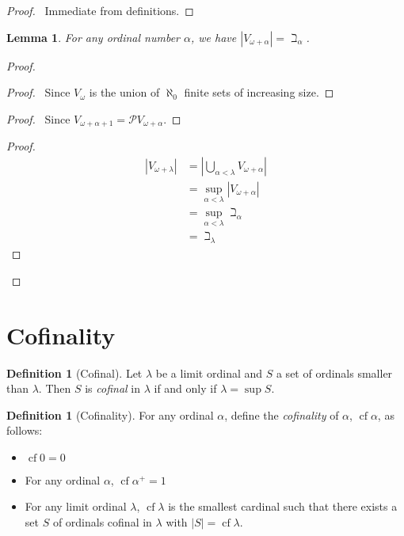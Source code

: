 \documentclass{book}
\let\qed\relax
\newtheorem{lm}[ax]{Lemma}
\theoremstyle{definition}
\newtheorem{df}[ax]{Definition}
\newcommand{\cf}{\ensuremath{\operatorname{cf}}}
\begin{document}
\begin{proof}
\pf\ Immediate from definitions. \qed
\end{proof}

\begin{lm}
For any ordinal number $\alpha$, we have $|V_{\omega + \alpha}| = \beth_\alpha$.
\end{lm}

\begin{proof}
\pf
{}
\begin{proof}
	\pf\ Since $V_\omega$ is the union of $\aleph_0$ finite sets of increasing size.
\end{proof}
\begin{proof}
	\pf\ Since $V_{\omega + \alpha + 1} = \mathcal{P} V_{\omega + \alpha}$.
\end{proof}
\begin{proof}
	\pf
	\begin{align*}
		|V_{\omega + \lambda}| & = \left| \bigcup_{\alpha < \lambda} V_{\omega + \alpha} \right| \\
		& = \sup_{\alpha < \lambda} |V_{\omega + \alpha}| \\
		& = \sup_{\alpha < \lambda} \beth_\alpha \\
		& = \beth_\lambda
	\end{align*}
\end{proof}
\qed
\end{proof}

\section{Cofinality}

\begin{df}[Cofinal]
Let $\lambda$ be a limit ordinal and $S$ a set of ordinals smaller than $\lambda$. Then $S$ is \emph{cofinal} in $\lambda$ if and only if $\lambda = \sup S$.
\end{df}

\begin{df}[Cofinality]
For any ordinal $\alpha$, define the \emph{cofinality} of $\alpha$, $\cf \alpha$, as follows:
\begin{itemize}
\item $\cf 0 = 0$
\item For any ordinal $\alpha$, $\cf \alpha^+ = 1$
\item For any limit ordinal $\lambda$, $\cf \lambda$ is the smallest cardinal such that there exists a set $S$ of ordinals cofinal in $\lambda$ with $|S| = \cf \lambda$.
\end{itemize}
\end{df}
\end{document}
